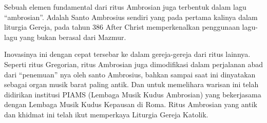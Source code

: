 Sebuah elemen fundamental dari ritus Ambrosian juga terbentuk dalam lagu ``ambrosian''. Adalah Santo Ambrosius sendiri yang pada pertama kalinya dalam liturgia Gereja, pada tahun 386 After Christ memperkenalkan penggunaan lagu-lagu yang bukan berasal dari Mazmur.

Inovasinya ini dengan cepat tersebar ke dalam gereja-gereja dari ritus lainnya. Seperti ritus Gregorian, ritus Ambrosian juga dimodifikasi dalam perjalanan abad dari ``penemuan'' nya oleh santo Ambrosius, bahkan sampai saat ini dinyatakan sebagai organ musik barat paling antik. Dan untuk memelihara warisan ini telah didirikan institusi PIAMS (Lembaga Musik Kudus Ambrosian) yang bekerjasama dengan Lembaga Musik Kudus Kepausan di Roma. Ritus Ambrosian yang antik dan khidmat ini telah ikut memperkaya Liturgia Gereja Katolik.

